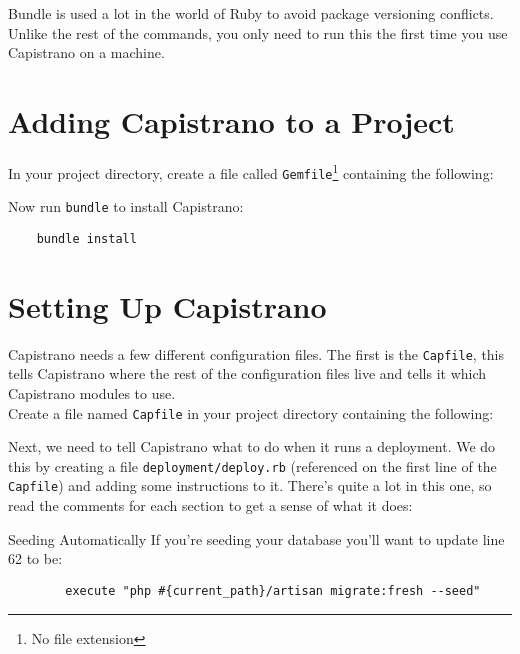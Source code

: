 Bundle is used a lot in the world of Ruby to avoid package versioning conflicts. Unlike the rest of the commands, you only need to run this the first time you use Capistrano on a machine.


\section{Adding Capistrano to a Project}

In your project directory, create a file called \texttt{Gemfile}\footnote{No file extension} containing the following:


Now run \texttt{bundle} to install Capistrano:

\begin{verbatim}
    bundle install
\end{verbatim}


\section{Setting Up Capistrano}

Capistrano needs a few different configuration files. The first is the \texttt{Capfile}, this tells Capistrano where the rest of the configuration files live and tells it which Capistrano modules to use.
\\

Create a file named \texttt{Capfile} in your project directory containing the following:


Next, we need to tell Capistrano what to do when it runs a deployment. We do this by creating a file \texttt{deployment/deploy.rb} (referenced on the first line of the \texttt{Capfile}) and adding some instructions to it. There's quite a lot in this one, so read the comments for each section to get a sense of what it does:


\begin{infobox}{Seeding Automatically}
    If you're seeding your database you'll want to update line 62 to be:

    \begin{verbatim}
        execute "php #{current_path}/artisan migrate:fresh --seed"
    \end{verbatim}
\end{infobox}


